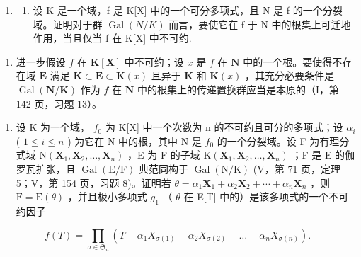 \BourbakiExerciseGroup

\begin{enumerate}
\def\labelenumi{\arabic{enumi})}
\tightlist
\item
  \begin{enumerate}
  \def\labelenumii{\alph{enumii})}
  \tightlist
  \item
    设 K 是一个域，f 是 K{[}X{]} 中的一个可分多项式，且 N 是 f 的一个分裂域。证明对于群 \(\operatorname{Gal}(N/K)\) 而言，要使它在 f 于 N 中的根集上可迁地作用，当且仅当 f 在 K{[}X{]} 中不可约.
  \end{enumerate}
\end{enumerate}

\begin{enumerate}
\def\labelenumi{\alph{enumi})}
\setcounter{enumi}{1}
\tightlist
\item
  进一步假设 \(f\) 在 \(\mathbf{K}[\mathbf{X}]\) 中不可约；设 \(x\) 是 \(f\) 在 \(\mathbf{N}\) 中的一个根。要使得不存在域 \(\mathbf{E}\) 满足 \(\mathbf{K} \subset \mathbf{E} \subset \mathbf{K}(x)\) 且异于 \(\mathbf{K}\) 和 \(\mathbf{K}(x)\) ，其充分必要条件是 \(\operatorname{Gal}(\mathbf{N} / \mathbf{K})\) 作为 \(f\) 在 \(\mathbf{N}\) 中的根集上的传递置换群应当是本原的（I，第 142 页，习题 13）。
\end{enumerate}

\begin{enumerate}
\def\labelenumi{\arabic{enumi})}
\setcounter{enumi}{1}
\tightlist
\item
  设 K 为一个域， \(f_{0}\) 为 K{[}X{]} 中一个次数为 n 的不可约且可分的多项式；设 \(\alpha_{i}\) ( \(1 \leqslant i \leqslant n\) ) 为它在 N 中的根，其中 N 是 \(f_{0}\) 的一个分裂域。设 F 为有理分式域 \(\mathrm{N}(\mathbf{X}_{1}, \mathbf{X}_{2}, \ldots, \mathbf{X}_{n})\) ，E 为 F 的子域 \(\mathrm{K}(\mathbf{X}_{1}, \mathbf{X}_{2}, \ldots, \mathbf{X}_{n})\) ；F 是 E 的伽罗瓦扩张，且 \(\operatorname{Gal}(\mathrm{E}/\mathrm{F})\) 典范同构于 \(\operatorname{Gal}(\mathrm{N}/\mathrm{K})\) (V，第 71 页，定理 5；V，第 154 页，习题 8)。证明若 \(\theta = \alpha_{1}\mathbf{X}_{1} + \alpha_{2}\mathbf{X}_{2} + \cdots + \alpha_{n}\mathbf{X}_{n}\) ，则 \(\mathrm{F} = \mathrm{E}(\theta)\) ，并且极小多项式 \(g_{1}\) （ \(\theta\) 在 E{[}T{]} 中的）是该多项式的一个不可约因子
\end{enumerate}

\[
f (T) = \prod_ {\sigma \in \mathfrak {S} _ {n}} \left(T - \alpha_ {1} X _ {\sigma (1)} - \alpha_ {2} X _ {\sigma (2)} - \dots - \alpha_ {n} X _ {\sigma (n)}\right).
\]

